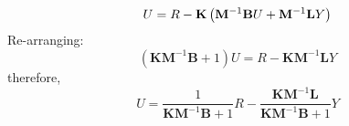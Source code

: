 \[
U=R-\mathbf{K}\left(\mathbf{M}^{-1}\mathbf{B}U + \mathbf{M}^{-1}{\bf{L}}Y\right)
\]
Re-arranging:
\[
\left(\mathbf{KM}^{-1}\mathbf{B}+1\right)U=R-\mathbf{KM}^{-1}\mathbf{L}Y
\]
therefore,
\[
U=\frac{1}{\mathbf{KM}^{-1}\mathbf{B}+1}R-\frac{\mathbf{KM}^{-1}\mathbf{L}}{\mathbf{KM}^{-1}\mathbf{B}+1}Y
\]

\endinput

